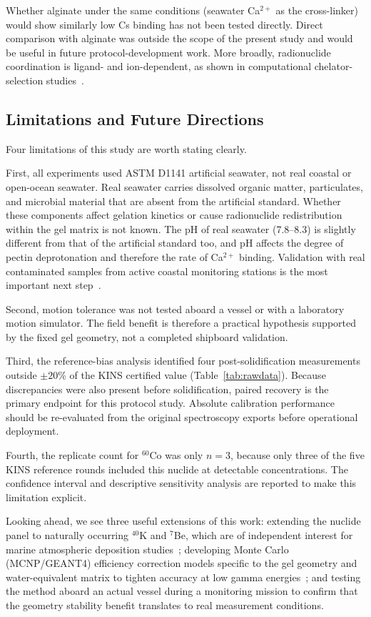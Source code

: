 \documentclass[preprint,12pt]{elsarticle}
\begin{document}
Whether alginate under the same conditions (seawater Ca$^{2+}$ as the
cross-linker) would show similarly low Cs binding has not been tested
directly.
Direct comparison with alginate was outside the scope of the present
study and would be useful in future protocol-development work.
More broadly, radionuclide coordination is ligand- and ion-dependent,
as shown in computational chelator-selection studies~\cite{Kim2026}.

\subsection{Limitations and Future Directions}

Four limitations of this study are worth stating clearly.

First, all experiments used ASTM D1141 artificial seawater, not
real coastal or open-ocean seawater.
Real seawater carries dissolved organic matter, particulates,
and microbial material that are absent from the artificial standard.
Whether these components affect gelation kinetics or cause
radionuclide redistribution within the gel matrix is not known.
The pH of real seawater (7.8--8.3) is slightly different from
that of the artificial standard too, and pH affects the degree of
pectin deprotonation and therefore the rate of Ca$^{2+}$ binding.
Validation with real contaminated samples from active coastal monitoring
stations is the most important next step~\cite{Choi2023}.

Second, motion tolerance was not tested aboard a vessel or with a
laboratory motion simulator. The field benefit is therefore a practical
hypothesis supported by the fixed gel geometry, not a completed
shipboard validation.

Third, the reference-bias analysis identified four post-solidification
measurements outside $\pm20$\% of the KINS certified value
(Table~\ref{tab:rawdata}). Because discrepancies were also present
before solidification, paired recovery is the primary endpoint for this
protocol study. Absolute calibration performance should be re-evaluated
from the original spectroscopy exports before operational deployment.

Fourth, the replicate count for $^{60}$Co was only $n=3$, because
only three of the five KINS reference rounds included this nuclide
at detectable concentrations.
The confidence interval and descriptive sensitivity analysis are reported
to make this limitation explicit.

Looking ahead, we see three useful extensions of this work:
extending the nuclide panel to naturally occurring $^{40}$K and
$^{7}$Be, which are of independent interest for marine atmospheric
deposition studies~\cite{Bae2025}; developing Monte Carlo
(MCNP/GEANT4) efficiency correction models specific to the gel
geometry and water-equivalent matrix to tighten accuracy at low
gamma energies~\cite{Corbacho2022}; and testing the method
aboard an actual vessel during a monitoring mission to confirm
that the geometry stability benefit translates to real measurement
conditions.
\end{document}
